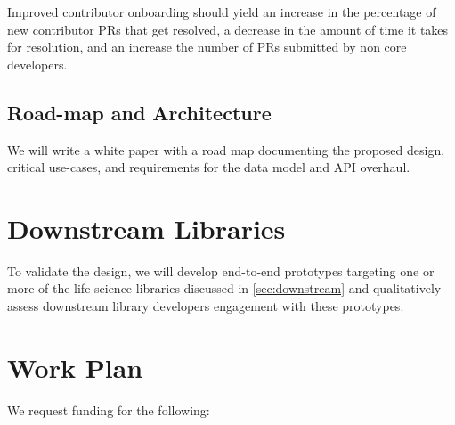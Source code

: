 \documentclass[11pt,letterpaper]{article}  %
\begin{document}
Improved contributor onboarding should yield an increase in the percentage of new contributor PRs that get resolved, a decrease in the amount of time it takes for resolution, and an increase the number of PRs submitted by non core developers.


\subsection{Road-map and Architecture}

We will write a white paper with a road map documenting the proposed design, critical use-cases, and requirements for the data model and API overhaul.


\section{Downstream Libraries}
To validate the design, we will develop end-to-end prototypes targeting one or more of the life-science libraries discussed in \ref{sec:downstream} and qualitatively assess downstream library developers engagement with these prototypes.

\section{Work Plan}

We request funding for the following:
\end{document}
